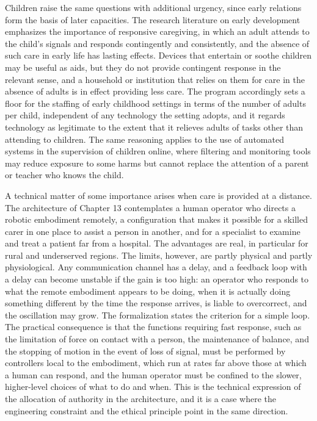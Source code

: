 Children raise the same questions with additional urgency, since early relations form the basis of later capacities. The research literature on early development emphasizes the importance of responsive caregiving, in which an adult attends to the child's signals and responds contingently and consistently, and the absence of such care in early life has lasting effects. Devices that entertain or soothe children may be useful as aids, but they do not provide contingent response in the relevant sense, and a household or institution that relies on them for care in the absence of adults is in effect providing less care. The program accordingly sets a floor for the staffing of early childhood settings in terms of the number of adults per child, independent of any technology the setting adopts, and it regards technology as legitimate to the extent that it relieves adults of tasks other than attending to children. The same reasoning applies to the use of automated systems in the supervision of children online, where filtering and monitoring tools may reduce exposure to some harms but cannot replace the attention of a parent or teacher who knows the child.

A technical matter of some importance arises when care is provided at a distance. The architecture of Chapter 13 contemplates a human operator who directs a robotic embodiment remotely, a configuration that makes it possible for a skilled carer in one place to assist a person in another, and for a specialist to examine and treat a patient far from a hospital. The advantages are real, in particular for rural and underserved regions. The limits, however, are partly physical and partly physiological. Any communication channel has a delay, and a feedback loop with a delay can become unstable if the gain is too high: an operator who responds to what the remote embodiment appears to be doing, when it is actually doing something different by the time the response arrives, is liable to overcorrect, and the oscillation may grow. The formalization states the criterion for a simple loop. The practical consequence is that the functions requiring fast response, such as the limitation of force on contact with a person, the maintenance of balance, and the stopping of motion in the event of loss of signal, must be performed by controllers local to the embodiment, which run at rates far above those at which a human can respond, and the human operator must be confined to the slower, higher-level choices of what to do and when. This is the technical expression of the allocation of authority in the architecture, and it is a case where the engineering constraint and the ethical principle point in the same direction.


